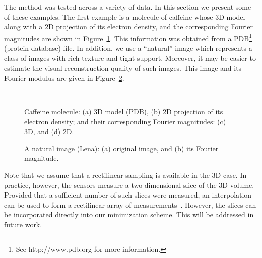 The method was tested across a variety of data. In this section we
present some of these examples. The first example is a molecule of
caffeine whose 3D model along with a 2D projection of its electron density, and
the corresponding Fourier magnitudes are shown in
Figure~\ref{fig:caffeine}. This information was obtained from a
PDB\footnote{See http://www.pdb.org for more
  information.} (protein database) file. In addition, we use a
``natural'' image which represents a class of images with rich texture
and tight support. Moreover, it may be easier to estimate the visual
reconstruction quality of such images. This image and its Fourier
modulus are given in Figure~\ref{fig:lena}.
\begin{figure}[H]
  \centering
  \hspace{.18\linewidth}
  \\
  \hspace{.15\linewidth}
\caption[Caffeine molecule]{Caffeine molecule: (a) 3D model (PDB), (b) 2D projection of
  its electron density; and their corresponding Fourier magnitudes:
  (c) 3D, and (d) 2D.  }
  \label{fig:caffeine}
\end{figure}
\begin{figure}[H]
  \centering
  \hspace{.15\linewidth}
  \caption[A natural image (Lena)]{A natural image (Lena): (a) original image, and (b) its
    Fourier magnitude.}
\label{fig:lena}
\end{figure}
Note that we assume that a rectilinear sampling is available in the 3D
case. In practice, however, the sensors measure a two-dimensional
slice of the 3D volume. Provided that a sufficient number of such
slices were measured, an interpolation can be used to form a
rectilinear array of measurements~. However, the
slices can be incorporated directly into our minimization scheme. This
will be addressed in future work.

